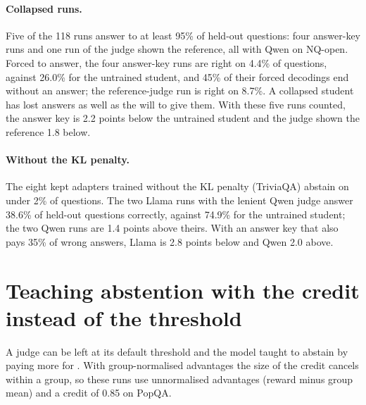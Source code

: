 \paragraph{Collapsed runs.} Five of the 118 runs answer \idk{} to at least 95\% of held-out questions: four answer-key runs and one run of the judge shown the reference, all with Qwen on NQ-open. Forced to answer, the four answer-key runs are right on 4.4\% of questions, against 26.0\% for the untrained student, and 45\% of their forced decodings end without an answer; the reference-judge run is right on 8.7\%. A collapsed student has lost answers as well as the will to give them. With these five runs counted, the answer key is 2.2 points below the untrained student and the judge shown the reference 1.8 below.

\paragraph{Without the KL penalty.} The eight kept adapters trained without the KL penalty (TriviaQA) abstain on under 2\% of questions. The two Llama runs with the lenient Qwen judge answer 38.6\% of held-out questions correctly, against 74.9\% for the untrained student; the two Qwen runs are 1.4 points above theirs. With an answer key that also pays 35\% of wrong answers, Llama is 2.8 points below and Qwen 2.0 above.

\section{Teaching abstention with the credit instead of the threshold}
\label{app:credit}

A judge can be left at its default threshold and the model taught to abstain by paying more for \idk{}. With group-normalised advantages the size of the credit cancels within a group, so these runs use unnormalised advantages (reward minus group mean) and a credit of 0.85 on PopQA.

